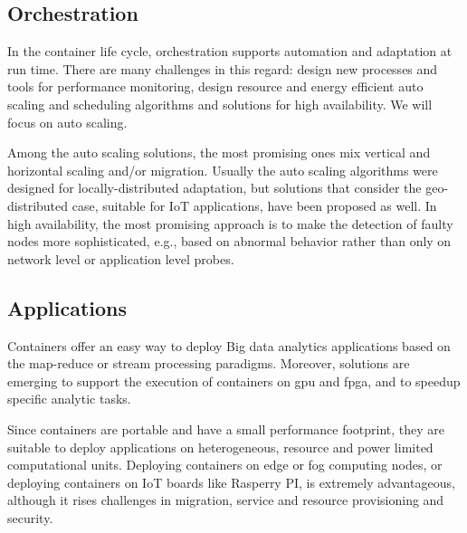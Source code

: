 \subsection{Orchestration}

In the container life cycle, orchestration supports automation and adaptation at run time. There are many challenges in this regard: design new processes and tools for performance monitoring, design resource and energy efficient auto scaling and scheduling algorithms and solutions for high availability. We will focus on auto scaling.

Among the auto scaling solutions, the most promising ones mix vertical and horizontal scaling and/or migration. Usually the auto scaling algorithms were designed for locally-distributed adaptation, but solutions that consider the geo-distributed case, suitable for IoT applications, have been
proposed as well. In high availability, the most promising approach is to make the detection of faulty nodes more sophisticated, e.g., based on abnormal behavior rather than only on network level or application level probes.~\cite{containersStateOfArt}

\subsection{Applications}

Containers offer an easy way to deploy Big data analytics applications based on the map-reduce or stream processing paradigms. Moreover, solutions are emerging to support the execution of containers on \gls{gpu} and \gls{fpga}, and to speedup specific analytic tasks.

Since containers are portable and have a small performance footprint, they are suitable to deploy applications on heterogeneous, resource and power limited computational units. Deploying containers on edge or fog computing nodes, or deploying containers on IoT boards like Rasperry
PI, is extremely advantageous, although it rises challenges in migration, service and resource provisioning and security.~\cite{containersStateOfArt}


